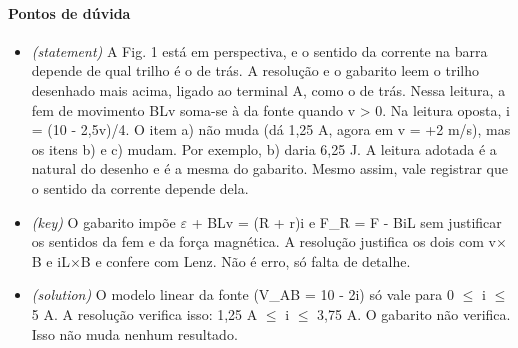 \documentclass{article}%
\begin{document}
\paragraph{Pontos de dúvida}%
\begin{itemize}%
\item%
\textit{(statement)} A Fig. 1 está em perspectiva, e o sentido da corrente na barra depende de qual trilho é o de trás. A resolução e o gabarito leem o trilho desenhado mais acima, ligado ao terminal A, como o de trás. Nessa leitura, a fem de movimento BLv soma{-}se à da fonte quando v > 0. Na leitura oposta, i = (10 - 2,5v)/4. O item a) não muda (dá 1,25 A, agora em v = +2 m/s), mas os itens b) e c) mudam. Por exemplo, b) daria 6,25 J. A leitura adotada é a natural do desenho e é a mesma do gabarito. Mesmo assim, vale registrar que o sentido da corrente depende dela.%
\item%
\textit{(key)} O gabarito impõe $\varepsilon$ + BLv = (R + r)i e F\_R = F - BiL sem justificar os sentidos da fem e da força magnética. A resolução justifica os dois com v$\times$B e iL$\times$B e confere com Lenz. Não é erro, só falta de detalhe.%
\item%
\textit{(solution)} O modelo linear da fonte (V\_AB = 10 - 2i) só vale para 0 $\leq$ i $\leq$ 5 A. A resolução verifica isso: 1,25 A $\leq$ i $\leq$ 3,75 A. O gabarito não verifica. Isso não muda nenhum resultado.%
\end{itemize}%
\end{document}
